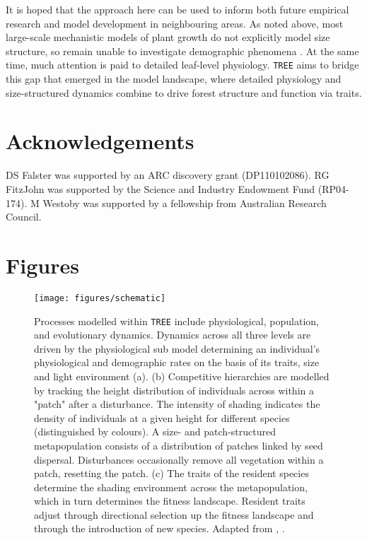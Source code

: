 \documentclass[a4paper,11pt]{article}
\begin{document}
It is hoped that the approach here can be used to inform both future empirical
research and model development in neighbouring areas. As noted above, most
large-scale mechanistic models of plant growth do not explicitly model size
structure, so remain unable to investigate demographic phenomena
\citep{Cramer-2001, Dekauwe-2014, Kelley-2013, Sitch-2003}. At the same time,
much attention is paid to detailed leaf-level physiology. \texttt{TREE} aims to bridge
this gap that emerged in the model landscape, where detailed physiology and
size-structured dynamics combine to drive forest structure and function via
traits.

\section{Acknowledgements}

DS Falster was supported by an ARC discovery grant (DP110102086). RG
FitzJohn was supported by the Science and Industry Endowment Fund
(RP04-174). M Westoby was supported by a fellowship from Australian
Research Council.

\clearpage


\clearpage

\section{Figures}\label{figures}

\begin{figure}[h!]
\centering
\texttt{[image: figures/schematic]}

\caption{Processes modelled within \texttt{TREE} include physiological, population, and
evolutionary dynamics.
Dynamics across all three levels are driven by the
physiological sub model determining an individual's physiological and
demographic rates on the basis of its traits, size and light environment (a).
(b) Competitive hierarchies  are modelled by tracking the height distribution of
individuals across within a "patch" after a disturbance. The intensity
of shading indicates the density of individuals at a given height for
different species (distinguished by colours). A size- and patch-structured
metapopulation consists of a distribution of patches linked by seed dispersal.
Disturbances occasionally remove all vegetation within a patch, resetting the
patch. (c) The traits of the resident species determine the shading environment
across the metapopulation, which in turn determines the fitness landscape.
Resident traits adjust through directional selection up the fitness landscape
and through the introduction of new species. Adapted from
\citet{Falster-2011}, \citet{Falster-2015}. }

\label{fig:schematic}
\end{figure}
\end{document}
